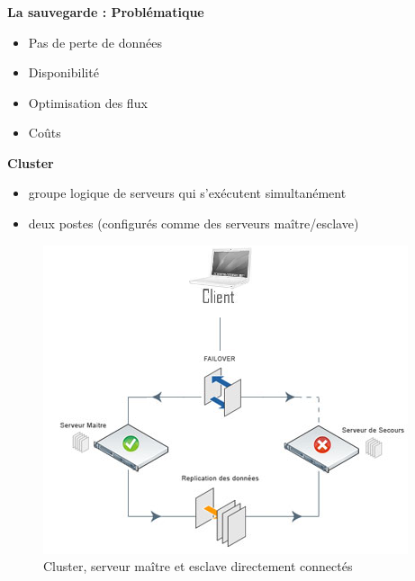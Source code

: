 \begin{frame}
\frametitle{}
\begin{block}{\textbf{La sauvegarde : Problématique}}
\begin{itemize}
\item Pas de perte de données
\item Disponibilité
\item Optimisation des flux
\item Coûts
\end{itemize}
\end{block}
\begin{block}{\textbf{Cluster}}
\begin{itemize}
\item groupe logique de serveurs qui s'exécutent simultanément
\item deux postes (configurés comme des serveurs maître/esclave)
\end{itemize}
\end{block}
\end{frame}

\begin{figure}[htbp]
	\centering
	\includegraphics[scale=0.7]{Images/SchemaCluster.png}
	\caption{Cluster, serveur maître et esclave directement connectés}
	\label{SchemaCluster}
\end{figure}

